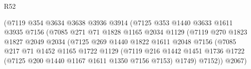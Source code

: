 \begin{lexlean}{R52}
\begin{coremodule}
                                      (@7119
                                        @354
                                        @3634
                                        @3638
                                        @3936
                                        @3914
                                        (@7125
                                          @353
                                          @1440
                                          @3633
                                          @1611
                                          @3935
                                          @7156
                                          (@7085
                                            @271
                                            @71
                                            @1828
                                            @1165
                                            @2034
                                            @1129
                                            (@7119
                                              @270
                                              @1823
                                              @1827
                                              @2049
                                              @2034
                                              (@7125
                                                @269
                                                @1440
                                                @1822
                                                @1611
                                                @2048
                                                @7156
                                                (@7085
                                                  @217
                                                  @71
                                                  @1452
                                                  @1165
                                                  @1722
                                                  @1129
                                                  (@7119
                                                    @216
                                                    @1442
                                                    @1451
                                                    @1736
                                                    @1722
                                                    (@7125 @200 @1440 @1167 @1611 @1350 @7156 @7153)
                                                    @1749)
                                                  @7152))
                                              @2067)

\end{coremodule}
\end{lexlean}
